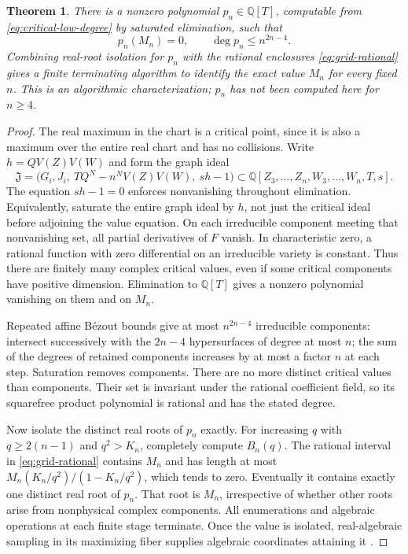 \documentclass[11pt]{article}
\newtheorem{theorem}{Theorem}[section]
\theoremstyle{remark}
\newcommand{\Q}{\mathbb Q}
\numberwithin{equation}{section}
\begin{document}
\begin{theorem}\label{thm:exact-algorithm}
There is a nonzero polynomial $p_n\in\Q[T]$, computable from
\eqref{eq:critical-low-degree} by saturated elimination, such that
\begin{equation}\label{eq:degree-bound}
 p_n(M_n)=0,\qquad \deg p_n\le n^{2n-4}.
\end{equation}
Combining real-root isolation for $p_n$ with the rational enclosures
\eqref{eq:grid-rational} gives a finite terminating algorithm to
identify the exact value $M_n$ for every fixed $n$.
This is an algorithmic characterization; $p_n$ has not been computed
here for $n\ge4$.
\end{theorem}
\begin{proof}
The real maximum in the chart is a critical point, since it is also
a maximum over the entire real chart and has no collisions.
Write $h=QV(Z)V(W)$ and form the graph ideal
\[
 \mathfrak J=\bigl(G_i,J_i,\ TQ^N-n^NV(Z)V(W),\ sh-1\bigr)
 \subset\Q[Z_3,\ldots,Z_n,W_3,\ldots,W_n,T,s].
\]
The equation $sh-1=0$ enforces nonvanishing throughout elimination.
Equivalently, saturate the entire graph ideal by $h$, not just the
critical ideal before adjoining the value equation.
On each irreducible component meeting that nonvanishing set, all
partial derivatives of $F$ vanish. In characteristic zero, a rational
function with zero differential on an irreducible variety is constant.
Thus there are finitely many complex critical values, even if some
critical components have positive dimension. Elimination to $\Q[T]$
gives a nonzero polynomial vanishing on them and on $M_n$.

Repeated affine B\'ezout bounds give at most $n^{2n-4}$ irreducible
components: intersect successively with the $2n-4$ hypersurfaces of
degree at most $n$; the sum of the degrees of retained components
increases by at most a factor $n$ at each step. Saturation removes
components. There are no more distinct critical values than components.
Their set is invariant under the rational coefficient field, so its
squarefree product polynomial is rational and has the stated degree.

Now isolate the distinct real roots of $p_n$ exactly. For increasing
$q$ with $q\ge2(n-1)$ and $q^2>K_n$, completely compute $B_n(q)$.
The rational interval in \eqref{eq:grid-rational} contains $M_n$ and
has length at most $M_n(K_n/q^2)/(1-K_n/q^2)$, which tends to zero.
Eventually it contains exactly one distinct real root of $p_n$.
That root is $M_n$, irrespective of whether other roots arise from
nonphysical complex components. All enumerations and algebraic
operations at each finite stage terminate. Once the value is isolated,
real-algebraic sampling in its maximizing fiber supplies algebraic
coordinates attaining it \cite{Basu}.
\end{proof}
\end{document}
